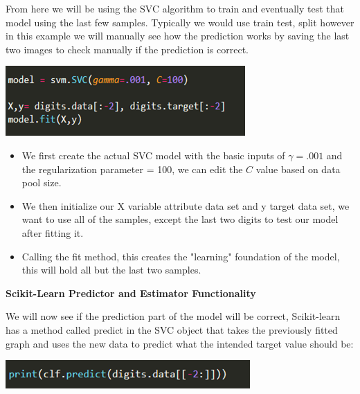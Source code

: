 \documentclass[a4paper,12pt]{report}
\newcommand{\msection}[1]{\noindent\textbf{#1}}
\begin{document}
From here we will be using the SVC algorithm to train and eventually test that model using the last few samples. Typically we would use train test, split however in this example we will manually see how the prediction works by saving the last two images to check manually if the prediction is correct.

\begin{center}
    \captionsetup{type=figure}
    \includegraphics[width=.9\linewidth]{media/svmSVC.png}
\end{center}

\begin{itemize}[,]
    \setlength\itemsep{-.1cm}
    \item We first create the actual SVC model with the basic inputs of $\gamma = .001$ and the regularization parameter = 100, we can edit the $C$ value based on data pool size.
    \item We then initialize our X variable attribute data set and y target data set, we want to use all of the samples, except the last two digits to test our model after fitting it.
    \item Calling the fit method, this creates the "learning" foundation of the model, this will hold all but the last two samples.
\end{itemize}

\msection{Scikit-Learn Predictor and Estimator Functionality}

We will now see if the prediction part of the model will be correct, Scikit-learn has a method called predict in the SVC object that takes the previously fitted graph and uses the new data to predict what the intended target value should be:

\begin{center}
    \captionsetup{type=figure}
    \includegraphics[width=.9\linewidth]{media/CLFpredict.png}
\end{center}
\end{document}
